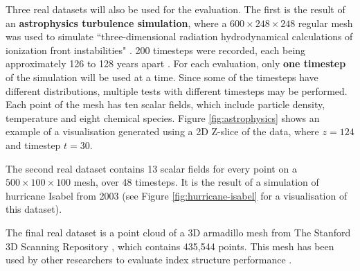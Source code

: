 Three real datasets will also be used for the evaluation. The first is the result of an \textbf{astrophysics turbulence simulation}, where a $600 \times 248 \times 248$ regular mesh was used to simulate ``three-dimensional radiation hydrodynamical calculations of ionization front instabilities" \cite{astrophysics-dataset}. 200 timesteps were recorded, each being approximately 126 to 128 years apart \cite{astrophysics-dataset}. For each evaluation, only \textbf{one timestep} of the simulation will be used at a time. Since some of the timesteps have different distributions, multiple tests with different timesteps may be performed. Each point of the mesh has ten scalar fields, which include particle density, temperature and eight chemical species. Figure \ref{fig:astrophysics} shows an example of a visualisation generated using a 2D Z-slice of the data, where $z = 124$ and timestep $t = 30$.

The second real dataset contains 13 scalar fields for every point on a $500 \times 100 \times 100$ mesh, over 48 timesteps. It is the result of a simulation of hurricane Isabel from 2003 \cite{hurricane-isabel-dataset} (see Figure \ref{fig:hurricane-isabel} for a visualisation of this dataset).

The final real dataset is a point cloud of a 3D armadillo mesh from The Stanford 3D Scanning Repository \cite{armadillo-mesh}, which contains 435,544 points. This mesh has been used by other researchers to evaluate index structure performance \cite{kd-tree-gpu, accelerating-kdtree-nn}.

